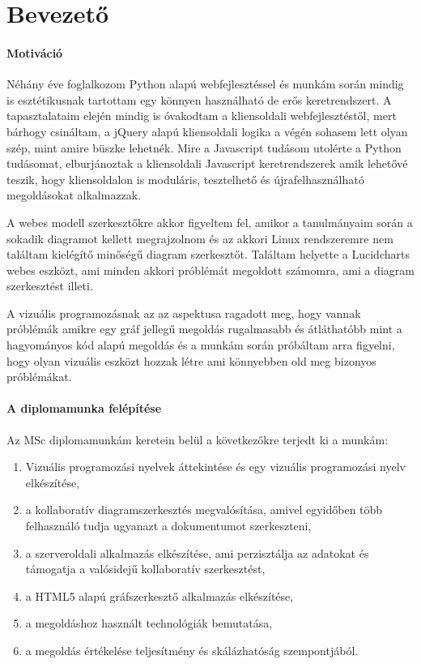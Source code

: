 \chapter*{Bevezető}

\subsubsection{Motiváció}
Néhány éve foglalkozom Python alapú webfejlesztéssel és munkám során mindig is esztétikusnak tartottam egy könnyen használható de erős keretrendszert. A tapasztalataim elején mindig is óvakodtam a kliensoldali webfejlesztéstől, mert bárhogy csináltam, a jQuery alapú kliensoldali logika a végén sohasem lett olyan szép, mint amire büszke lehetnék. Mire a Javascript tudásom utolérte a Python tudásomat, elburjánoztak a kliensoldali Javascript keretrendszerek amik lehetővé teszik, hogy kliensoldalon is moduláris, tesztelhető és újrafelhasználható megoldásokat alkalmazzak.

A webes modell szerkesztőkre akkor figyeltem fel, amikor a tanulmányaim során a sokadik diagramot kellett megrajzolnom és az akkori Linux rendszeremre nem találtam kielégítő minőségű diagram szerkesztőt. Találtam helyette a Lucidcharts webes eszközt, ami minden akkori próblémát megoldott számomra, ami a diagram szerkesztést illeti.

A vizuális programozásnak az az aspektusa ragadott meg, hogy vannak próblémák amikre egy gráf jellegű megoldás rugalmasabb és átláthatóbb mint a hagyományos kód alapú megoldás és a munkám során próbáltam arra figyelni, hogy olyan vizuális eszközt hozzak létre ami könnyebben old meg bizonyos próblémákat.


\subsubsection{A diplomamunka felépítése}
Az MSc diplomamunkám keretein belül a következőkre terjedt ki a munkám:
\begin{enumerate}
\item Vizuális programozási nyelvek áttekintése és egy vizuális programozási nyelv elkészítése,
\item a kollaboratív diagramszerkesztés megvalósítása, amivel egyidőben több felhasználó tudja ugyanazt a dokumentumot szerkeszteni,
\item a szerveroldali alkalmazás elkészítése, ami perzisztálja az adatokat és támogatja a valósidejű kollaboratív szerkesztést,
\item a HTML5 alapú gráfszerkesztő alkalmazás elkészítése,
\item a megoldáshoz használt technológiák bemutatása, 
\item a megoldás értékelése teljesítmény és skálázhatóság szempontjából.
\end{enumerate}

